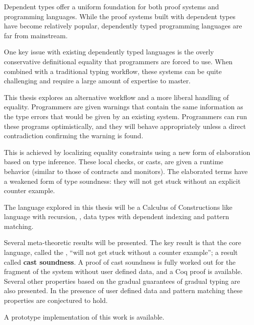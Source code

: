 Dependent types offer a uniform foundation for both proof systems and programming languages.
While the proof systems built with dependent types have become relatively popular, dependently typed programming languages are far from mainstream.

One key issue with existing dependently typed languages is the overly conservative definitional equality that programmers are forced to use.
When combined with a traditional typing workflow, these systems can be quite challenging and require a large amount of expertise to master.

This thesis explores an alternative workflow and a more liberal handling of equality.
Programmers are given warnings that contain the same information as the type errors that would be given by an existing system.
Programmers can run these programs optimistically, and they will behave appropriately unless a direct contradiction confirming the warning is found.

This is achieved by localizing equality constraints using a new form of elaboration based on \bidir{} type inference.
These local checks, or casts, are given a runtime behavior (similar to those of contracts and monitors).
The elaborated terms have a weakened form of type soundness: they will not get stuck without an explicit counter example.

The language explored in this thesis will be a Calculus of Constructions like language with recursion, \tit{}, data types with dependent indexing and pattern matching.

Several meta-theoretic results will be presented.
The key result is that the core language, called the \textbf{\csys{}}, ``will not get stuck without a counter example''; a result called \textbf{cast soundness}.
A proof of cast soundness is fully worked out for the fragment of the system without user defined data, and a Coq proof is available. Several other properties based on the gradual guarantees of gradual typing are also presented.
In the presence of user defined data and pattern matching these properties are conjectured to hold.

A prototype implementation of this work is available.

